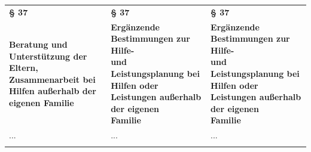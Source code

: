 \documentclass[10pt,a4paper,landscape]{article}
\begin{document}
\begin{longtable}{|L{8.2cm}|L{8.2cm}|L{8.2cm}|}
\hhline{|---|}
\textbf{\S{} 37} & \textbf{\S{} 37 } & \textbf{\S{} 37 } \\
\hhline{|---|}
\textbf{\textcolor{diffred}{Beratung} und \textcolor{diffred}{Unterstützung der Eltern,  \newline Zusammenarbeit} bei Hilfen außerhalb der  \newline eigenen Familie} & \textbf{Ergänzende Bestimmungen zur Hilfe-  \newline und Leistungsplanung bei Hilfen oder  \newline Leistungen außerhalb der eigenen  \newline Familie } & \textbf{Ergänzende Bestimmungen zur Hilfe-  \newline und Leistungsplanung bei Hilfen oder  \newline Leistungen außerhalb der eigenen  \newline Familie } \\
\hhline{|---|}
... & ... & ... \\
\hhline{|---|}

\end{longtable}
\end{document}
